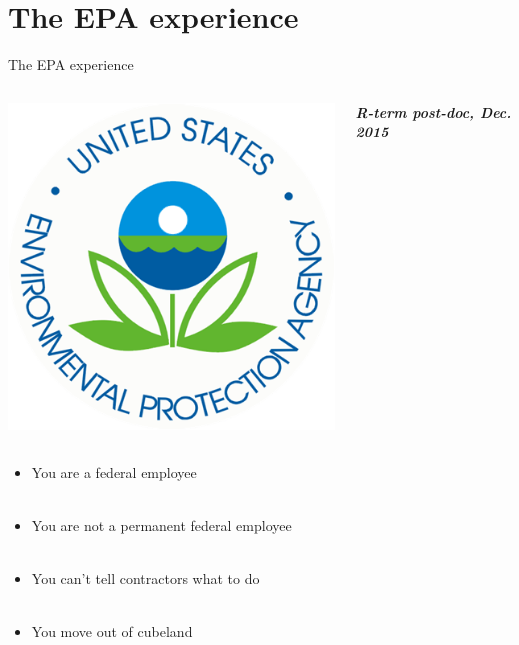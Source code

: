 \documentclass[serif]{beamer}\usepackage[]{graphicx}\usepackage[]{color}
\begin{document}
\section{The EPA experience}

\begin{frame}{The EPA experience}{}
\begin{columns}
\begin{column}{0.3\textwidth}
\centerline{\includegraphics[width=0.5\linewidth]{fig/epa_logo.png}}
\end{column}
\begin{column}{0.7\textwidth}
\textbf{\textit{\Large {R-term post-doc, Dec. 2015}}}
\end{column}
\end{columns}
\vspace{0.15in}
\begin{itemize}
\item<2-> You are a federal employee \\~\\
\item<3-> You are not a permanent federal employee \\~\\
\item<4-> You can't tell contractors what to do \\~\\
\item<5-> You move out of cubeland
\end{itemize}
\end{frame}
\end{document}
